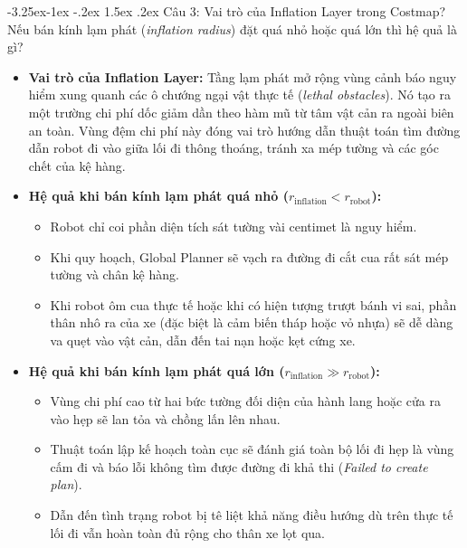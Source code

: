 \documentclass[11pt,a4paper]{article}
\makeatletter
\renewcommand{\subsection}{\@startsection{subsection}{2}{\z@}%
  {-3.25ex\@plus -1ex \@minus -.2ex}%
  {1.5ex \@plus .2ex}%
  {\normalfont\large\bfseries\color{secondary}}}
\makeatother
\begin{document}
\subsection{Câu 3: Vai trò của Inflation Layer trong Costmap? Nếu bán kính lạm phát (\textit{inflation radius}) đặt quá nhỏ hoặc quá lớn thì hệ quả là gì?}
\begin{itemize}
  \item \textbf{Vai trò của Inflation Layer:} Tầng lạm phát mở rộng vùng cảnh báo nguy hiểm xung quanh các ô chướng ngại vật thực tế (\textit{lethal obstacles}). Nó tạo ra một trường chi phí dốc giảm dần theo hàm mũ từ tâm vật cản ra ngoài biên an toàn. Vùng đệm chi phí này đóng vai trò hướng dẫn thuật toán tìm đường dẫn robot đi vào giữa lối đi thông thoáng, tránh xa mép tường và các góc chết của kệ hàng.
  \item \textbf{Hệ quả khi bán kính lạm phát quá nhỏ ($r_{\text{inflation}} < r_{\text{robot}}$):}
  \begin{itemize}
    \item Robot chỉ coi phần diện tích sát tường vài centimet là nguy hiểm.
    \item Khi quy hoạch, Global Planner sẽ vạch ra đường đi cắt cua rất sát mép tường và chân kệ hàng.
    \item Khi robot ôm cua thực tế hoặc khi có hiện tượng trượt bánh vi sai, phần thân nhô ra của xe (đặc biệt là cảm biến tháp hoặc vỏ nhựa) sẽ dễ dàng va quẹt vào vật cản, dẫn đến tai nạn hoặc kẹt cứng xe.
  \end{itemize}
  \item \textbf{Hệ quả khi bán kính lạm phát quá lớn ($r_{\text{inflation}} \gg r_{\text{robot}}$):}
  \begin{itemize}
    \item Vùng chi phí cao từ hai bức tường đối diện của hành lang hoặc cửa ra vào hẹp sẽ lan tỏa và chồng lấn lên nhau.
    \item Thuật toán lập kế hoạch toàn cục sẽ đánh giá toàn bộ lối đi hẹp là vùng cấm đi và báo lỗi không tìm được đường đi khả thi (\textit{Failed to create plan}).
    \item Dẫn đến tình trạng robot bị tê liệt khả năng điều hướng dù trên thực tế lối đi vẫn hoàn toàn đủ rộng cho thân xe lọt qua.
  \end{itemize}
\end{itemize}
\end{document}

